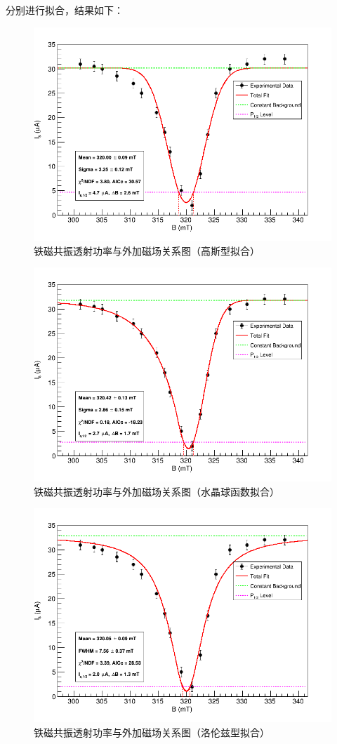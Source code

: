 \documentclass{thuemp}
\begin{document}
分别进行拟合，结果如下：
\begin{figure}[H]
    \centering
    \includegraphics[width=0.9\linewidth]{../Data/FMR_ConstantBg_GaussPeak.png}
    \caption{铁磁共振透射功率与外加磁场关系图（高斯型拟合）} \label{fig:FMR_Gauss}
\end{figure}
\begin{figure}[H]
    \centering
    \includegraphics[width=0.9\linewidth]{../Data/FMR_ConstantBg_CrystalBallPeak.png}
    \caption{铁磁共振透射功率与外加磁场关系图（水晶球函数拟合）} \label{fig:FMR_CrystalBall}
\end{figure}
\begin{figure}[H]
    \centering
    \includegraphics[width=0.9\linewidth]{../Data/FMR_ConstantBg_LorentzPeak.png}
    \caption{铁磁共振透射功率与外加磁场关系图（洛伦兹型拟合）} \label{fig:FMR_Lorentz}
\end{figure}
\end{document}
